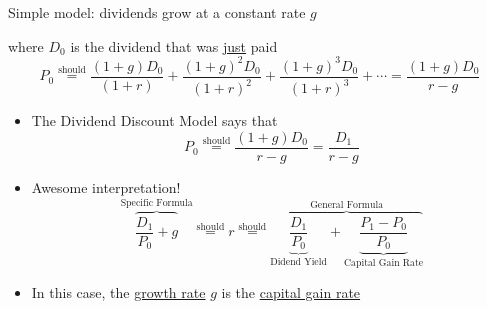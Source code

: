 \documentclass{beamer}
\newcommand{\should}{\overset{\text{should}}{=}}
\begin{document}
\begin{frame}{}
Simple model: dividends grow at a constant rate $g$ 
\begin{figure}[H]
	\begin{center}
	\end{center}
\end{figure}
where $D_{0}$ is the dividend that was \underline{just} paid
\begin{equation*}
	P_{0}\should\frac{(1+g)D_{0}}{(1+r)}+\frac{(1+g)^{2}D_{0}}{(1+r)^2}+\frac{(1+g)^{3}D_{0}}{(1+r)^3}+\cdots=\frac{(1+g)D_{0}}{r-g}
\end{equation*}
\end{frame}

\begin{frame}{}
\begin{itemize}
	\item The Dividend Discount Model says that
	\begin{equation*}
		P_{0}\should\frac{(1+g)D_{0}}{r-g}=\frac{D_{1}}{r-g}
	\end{equation*}
	\item Awesome interpretation!
	\begin{equation*}
		\overbrace{\frac{D_{1}}{P_{0}}+g}^{\text{Specific Formula}}\should r\should\overbrace{\underbrace{\frac{D_{1}}{P_{0}}}_{\text{Didend Yield}}+\underbrace{\frac{P_{1}-P_{0}}{P_{0}}}_{\text{Capital Gain Rate}}}^{\text{General Formula}}
	\end{equation*}
	\item In this case, the \underline{growth rate} $g$ is the \underline{capital gain rate}
\end{itemize}
\end{frame}
\end{document}

